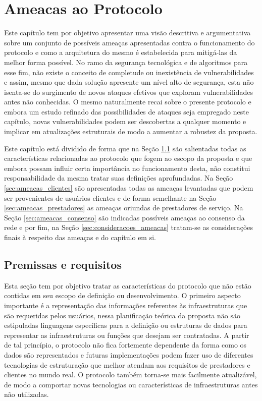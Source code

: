 \chapter{Ameacas ao Protocolo}
\label{ch:ameaças}

Este capítulo tem por objetivo apresentar uma visão descritiva e argumentativa sobre um conjunto de possíveis ameaças apresentadas contra o funcionamento do protocolo e como a arquitetura do mesmo é estabelecida para mitigá-las da melhor forma possível. No ramo da segurança tecnológica e de algoritmos para esse fim, não existe o conceito de completude ou inexistência de vulnerabilidades e assim, mesmo que dada solução apresente um nível alto de segurança, esta não isenta-se do surgimento de novos ataques efetivos que exploram vulnerabilidades antes não conhecidas. O mesmo naturalmente recai sobre o presente protocolo e embora um estudo refinado das possibilidades de ataques seja empregado neste capítulo, novas vulnerabilidades podem ser descobertas a qualquer momento e implicar em atualizações estruturais de modo a aumentar a robustez da proposta.

Este capítulo está dividido de forma que na Seção \ref{sec:premissas_requisitos} são salientadas todas as características relacionadas ao protocolo que fogem ao escopo da proposta e que embora possam influir certa importância no funcionamento desta, não constitui responsabilidade da mesma tratar suas definições aprofundadas. Na Seção \ref{sec:ameacas_clientes} são apresentadas todas as ameaças levantadas que podem ser provenientes de usuários clientes e de forma semelhante na Seção \ref{sec:ameacas_prestadores} as ameaças oriundas de prestadores de serviço. Na Seção \ref{sec:ameacas_consenso} são indicadas possíveis ameaças ao consenso da rede e por fim, na Seção \ref{sec:consideracoes_ameacas} tratam-se as considerações finais à respeito das ameaças e do capítulo em si.

\section{Premissas e requisitos}
\label{sec:premissas_requisitos}

Esta seção tem por objetivo tratar as características do protocolo que não estão contidas em seu escopo de definição ou desenvolvimento. O primeiro aspecto importante é a representação das informações referentes às infraestruturas que são requeridas pelos usuários, nessa planificação teórica da proposta não são estipuladas linguagens específicas para a definição ou estruturas de dados para representar as infraestruturas ou funções que desejam ser contratadas. A partir de tal princípio, o protocolo não fica fortemente dependente da forma como os dados são representados e futuras implementações podem fazer uso de diferentes tecnologias de estruturação que melhor atendam aos requisitos de prestadores e clientes no mundo real. O protocolo também torna-se mais facilmente atualizável, de modo a comportar novas tecnologias ou características de infraestruturas antes não utilizadas.

